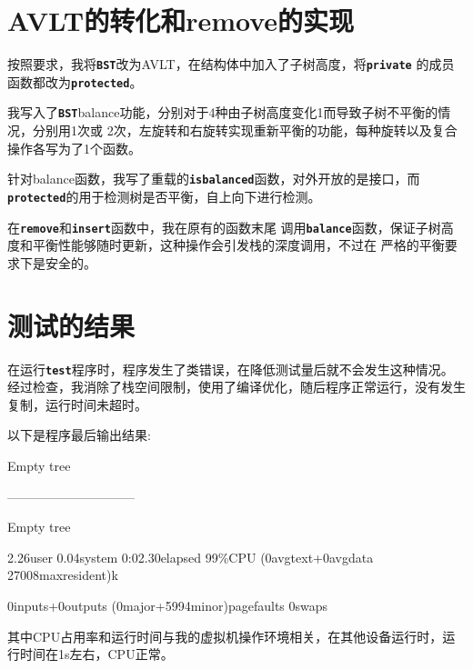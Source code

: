 \documentclass[UTF8]{ctexart}
\begin{document}
\pagestyle{fancy}
\fancyhead{}

\section{AVLT的转化和remove的实现}
按照要求，我将\textbf{\texttt{BST}}改为AVLT，在结构体中加入了子树高度，将\textbf{\texttt{private}}
的成员函数都改为\textbf{\texttt{protected}}。\par
我写入了\textbf{\texttt{BST}}balance功能，分别对于4种由子树高度变化1而导致子树不平衡的情况，分别用1次或
2次，左旋转和右旋转实现重新平衡的功能，每种旋转以及复合操作各写为了1个函数。\par
针对balance函数，我写了重载的\textbf{\texttt{isbalanced}}函数，对外开放的是接口，而
\textbf{\texttt{protected}}的用于检测树是否平衡，自上向下进行检测。\par
在\textbf{\texttt{remove}}和\textbf{\texttt{insert}}函数中，我在原有的函数末尾
调用\textbf{\texttt{balance}}函数，保证子树高度和平衡性能够随时更新，这种操作会引发栈的深度调用，不过在
严格的平衡要求下是安全的。\par
\section{测试的结果}
在运行\textbf{\texttt{test}}程序时，程序发生了类错误，在降低测试量后就不会发生这种情况。
经过检查，我消除了栈空间限制，使用了编译优化，随后程序正常运行，没有发生复制，运行时间未超时。\par
以下是程序最后输出结果:\par
Empty tree\par
------------------------------\par
Empty tree\par
2.26user 0.04system 0:02.30elapsed 99\%CPU (0avgtext+0avgdata 27008maxresident)k \par
0inputs+0outputs (0major+5994minor)pagefaults 0swaps\par
其中CPU占用率和运行时间与我的虚拟机操作环境相关，在其他设备运行时，运行时间在1s左右，CPU正常。
\end{document}
